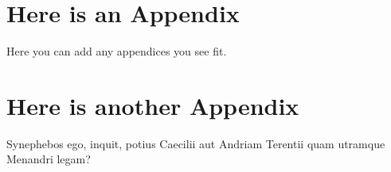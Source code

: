 % 


\section{Here is an Appendix}
\label{extra1}

Here you can add any appendices you see fit.

\clearpage

\section{Here is another Appendix}
\label{extra2}

Synephebos ego, inquit, potius Caecilii aut Andriam Terentii quam utramque Menandri legam?